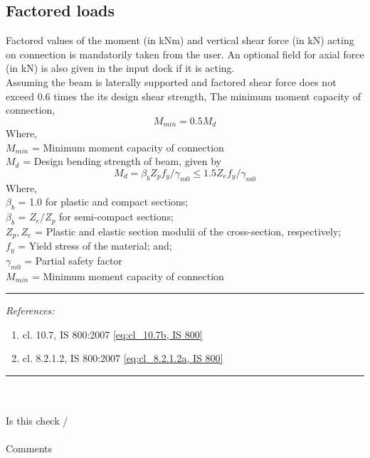 \documentclass[11.5pt,a4paper,oneside]{report}
\newcommand{\okornot}{ \vspace{15mm} \hrule
	\noindent \\ \\
	Is this check \qquad
	\CheckBox[checked=False, name= ok]{\textbf{Ok}} \qquad / 
	\CheckBox[checked=False, name= notok]{\textbf{Not Ok}}\\ \\
	Comments \\ \\
	\noindent
	\TextField[name=multilinetextbox, multiline=true, width=1.0\linewidth,height=2in]{}}
\newcommand{\checkrefernces} {
	\vspace{15mm} \hrule \vspace{2mm}
	\textit{References:}}
\begin{document}
\begin{Form}
\chapter{Factored loads}
%
Factored values of the moment (in kNm) and vertical shear force  (in kN) acting on connection is mandatorily taken from the user. An optional field for axial force (in kN) is also given in the input dock if it is acting.\\
Assuming the beam is laterally supported and factored shear force does not exceed 0.6 times the its design shear strength, 
The minimum moment capacity of connection,
\begin{equation}\label{eq:cl_10.7b, IS 800}
	M_{min} = 0.5 M_d 
\end{equation}
Where, \\
\indent $M_{min}$ = Minimum moment capacity of connection \\
\indent $M_d$ = Design bending strength of beam, given by
\begin{equation} \label{eq:cl_8.2.1.2a, IS 800}
M_d = \beta_b Z_p f_y / \gamma_{m0} \le 1.5 Z_e f_y / \gamma_{m0} 
\end{equation}
Where, \\
\indent $\beta_b$ = 1.0 for plastic and compact sections;\\
\indent $\beta_b$ = $Z_e/Z_p$ for semi-compact sections;\\
\indent $Z_p, Z_e$ = Plastic and elastic section modulii of the cross-section, respectively; \\
\indent $f_y$ = Yield stress of the material; and;\\
\indent $\gamma_{m0}$ = Partial safety factor \\
\indent $M_{min}$ = Minimum moment capacity of connection



\checkrefernces
\begin{enumerate}
	\item cl. 10.7, IS 800:2007 \eqref{eq:cl_10.7b, IS 800} 
	\item cl. 8.2.1.2, IS 800:2007 \eqref{eq:cl_8.2.1.2a, IS 800} 
\end{enumerate}
\okornot

\end{Form}
\end{document}
